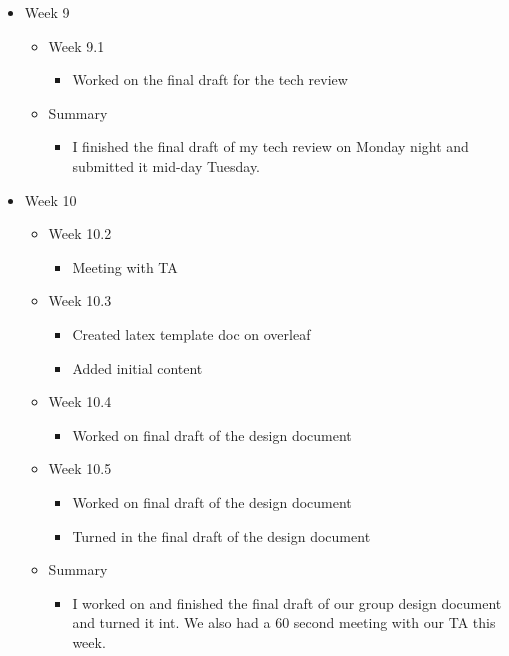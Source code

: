 \begin{itemize}
\item Week 9
	\begin{itemize}
	\item Week 9.1
      \begin{itemize}
      \item Worked on the final draft for the tech review 
      \end{itemize}
    
    \item Summary
      \begin{itemize}
      \item I finished the final draft of my tech review on Monday night and submitted it mid-day Tuesday.  
      \end{itemize}
	\end{itemize}

\item Week 10
	\begin{itemize}
	\item Week 10.2
      \begin{itemize}
      \item Meeting with TA
      \end{itemize}
	\item Week 10.3
      \begin{itemize}
      \item Created latex template doc on overleaf 
      \item Added initial content
      \end{itemize}
	\item Week 10.4
      \begin{itemize}
      \item Worked on final draft of the design document 
      \end{itemize}
	\item Week 10.5
      \begin{itemize}
      \item Worked on final draft of the design document 
      \item Turned in the final draft of the design document 
      \end{itemize}
    
    \item Summary
      \begin{itemize}
      \item I worked on and finished the final draft of our group design document and turned it int. We also had a 60 second meeting with our TA this week.  
      \end{itemize}
	\end{itemize}

\end{itemize}




